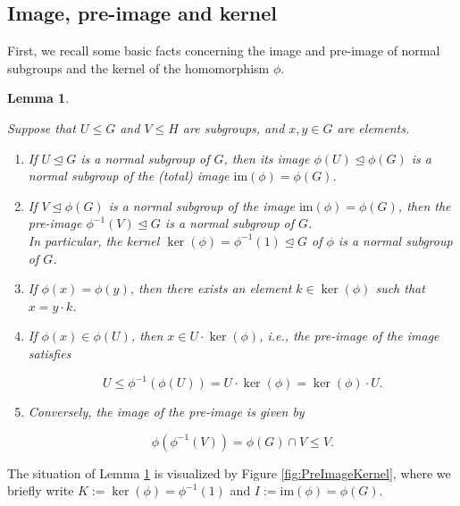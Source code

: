 \documentclass{amsart}
\newtheorem{lemma}{Lemma}[section]
\theoremstyle{definition}
\numberwithin{equation}{section}
\begin{document}
\subsection{Image, pre-image and kernel}
\label{ss:ImPreKer}

First, we recall some basic facts concerning the image and pre-image of normal subgroups
and the kernel of the homomorphism \(\phi\).


\begin{lemma}
\label{lem:NrmSbgAndKer}

Suppose that \(U\le G\) and \(V\le H\) are subgroups, and \(x,y\in G\) are elements.

\begin{enumerate}

\item
If \(U\unlhd G\) is a normal subgroup of \(G\),
then its image \(\phi(U)\unlhd\phi(G)\) is a normal subgroup of the (total) image \(\mathrm{im}(\phi)=\phi(G)\).

\item
If \(V\unlhd\phi(G)\) is a normal subgroup of the image \(\mathrm{im}(\phi)=\phi(G)\),
then the pre-image \(\phi^{-1}(V)\unlhd G\) is a normal subgroup of \(G\).\\
In particular,
the kernel \(\ker(\phi)=\phi^{-1}(1)\unlhd G\) of \(\phi\) is a normal subgroup of \(G\).

\item
If \(\phi(x)=\phi(y)\),
then there exists an element \(k\in\ker(\phi)\) such that \(x=y\cdot k\).

\item
If \(\phi(x)\in\phi(U)\),
then \(x\in U\cdot\ker(\phi)\), i.e., the pre-image of the image satisfies

\begin{equation}
\label{eqn:InvAfterDir}
U\le\phi^{-1}(\phi(U))=U\cdot\ker(\phi)=\ker(\phi)\cdot U.
\end{equation}

\item
Conversely, the image of the pre-image is given by

\begin{equation}
\label{eqn:DirAfterInv}
\phi(\phi^{-1}(V))=\phi(G)\cap V\le V.
\end{equation}

\end{enumerate}

\end{lemma}


\noindent
The situation of Lemma
\ref{lem:NrmSbgAndKer}
is visualized by Figure
\ref{fig:PreImageKernel},
where we briefly write
\(K:=\ker(\phi)=\phi^{-1}(1)\)
and
\(I:=\mathrm{im}(\phi)=\phi(G)\).
\end{document}
